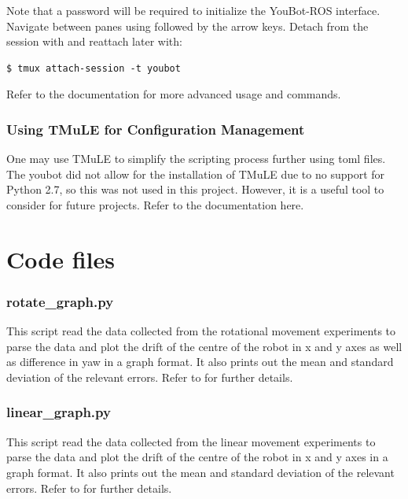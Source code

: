 \documentclass[a4paper, 12pt]{article}
\newif\ifshownotes
\newcommand{\notes}[1]{\ifshownotes\textcolor{blue}{#1}\fi}
\newcommand{\code}[1]{\texttt{\detokenize{#1}}}
\begin{document}
    Note that a password will be required to initialize the YouBot-ROS interface. Navigate between panes using \code{Ctrl+b} followed by the arrow keys. Detach from the session with \code{Ctrl+b d} and reattach later with:
    \begin{lstlisting}[style=plain]
    $ tmux attach-session -t youbot
    \end{lstlisting}
    
    Refer to the \code{tmux} documentation for more advanced usage and commands.

    \subsubsection{Using TMuLE for Configuration Management}

    One may use TMuLE to simplify the scripting process further using toml files. The youbot did not allow for the installation of TMuLE due to no support for Python 2.7, so this was not used in this project. However, it is a useful tool to consider for future projects. Refer to the documentation here. 
   
    \pagebreak
    \section{Code files}
    \subsubsection{rotate\_graph.py}
    This script read the data collected from the rotational movement experiments to parse the data and plot the drift of the centre of the robot in x and y axes as well as difference in yaw in a graph format. It also prints out the mean and standard deviation of the relevant errors. Refer to \notes{insert something here idr} for further details. 
    
    \pagebreak
    \subsubsection{linear\_graph.py}
    This script read the data collected from the linear movement experiments to parse the data and plot the drift of the centre of the robot in x and y axes in a graph format. It also prints out the mean and standard deviation of the relevant errors. Refer to \notes{insert something here idr} for further details. 
    
    \pagebreak
\end{document}
